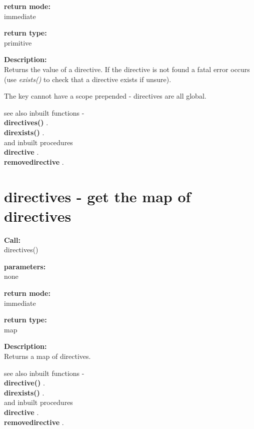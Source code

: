        {\bf return mode:} \\
        immediate

        {\bf return type:} \\
        primitive
        
        {\bf Description:} \\
        Returns the value of a directive. If the directive is not found a
        fatal error occurs (use {\em exists()} to check that a directive
        exists if unsure).

        The key cannot have a scope prepended - directives are all global.

        see also inbuilt functions - \\
        {\bf directives()} . \\
        {\bf direxists()} .\\
        and inbuilt procedures \\
        {\bf directive} .\\
        {\bf removedirective} .


    \section{directives - get the map of directives}\label{sec:ifdirectives}
        
        {\bf Call:} \\
        directives()
        
        {\bf parameters:} \\
        none
        
        {\bf return mode:} \\
        immediate

        {\bf return type:} \\
        map
        
        {\bf Description:} \\
        Returns a map of directives.

        see also inbuilt functions - \\
        {\bf directive()} .\\
        {\bf direxists()} .\\
        and inbuilt procedures \\
        {\bf directive} .\\
        {\bf removedirective} .

